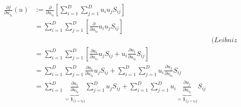 \documentclass[12pt]{article}
\begin{document}
\begin{align}
    \frac{\partial f}{\partial u_{i_0}} (u)
    \nonumber
     & := \frac{\partial}{\partial u_{i_0}} \left[ \sum_{i=1}^{D} \sum_{j=1}^{D} u_{i} u_{j} S_{i j} \right]                                                                                                                                                                                                             \\
    \nonumber
     & = \sum_{i=1}^{D} \sum_{j=1}^{D} \left[ \frac{\partial}{\partial u_{i_0}} u_{i} u_{j} S_{i j} \right]                                                                                                                                                                                                              \\
    \nonumber
     &                                                                                                                                                                                                                                                                   & \textit{(Leibniz rule)}                       \\
    \nonumber
     & = \sum_{i=1}^{D} \sum_{j=1}^{D} \left[ \frac{\partial u_{i}}{\partial u_{i_0}} u_{j} S_{i j} + u_{i}  \frac{\partial u_{j}}{\partial u_{i_0}} S_{i j} \right]                                                                                                                                                     \\
    \nonumber
     & = \sum_{i=1}^{D} \sum_{j=1}^{D} \frac{\partial u_{i}}{\partial u_{i_0}} u_{j} S_{i j} + \sum_{i=1}^{D} \sum_{j=1}^{D} u_{i} \frac{\partial u_{j}}{\partial u_{i_0}} S_{i j}                                                                                                                                       \\
    \nonumber
     & = \sum_{i=1}^{D} \underbrace{\frac{\partial u_{i}}{\partial u_{i_0}}}_{=\boldsymbol{1}_{\{i=i_0\}}} \sum_{j=1}^{D} u_{j} S_{i j} + \sum_{i=1}^{D} \sum_{j=1}^{D} u_{i} \underbrace{\frac{\partial u_{j}}{\partial u_{i_0}}}_{=\boldsymbol{1}_{\{j=i_0\}}} S_{i j}                                                 \\

\end{align}
\end{document}
